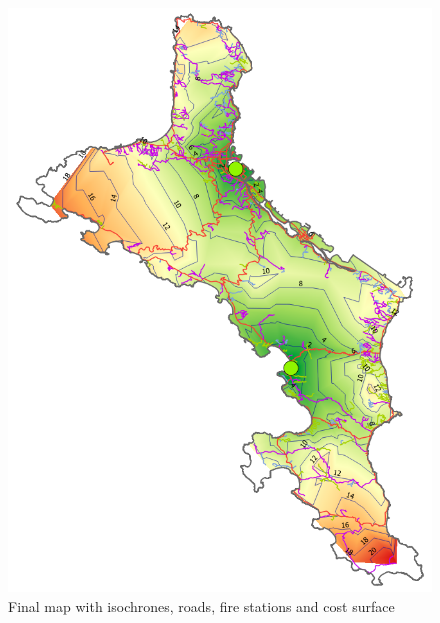 \documentclass[a4paper,12pt,titlepage]{article}
\begin{document}
\begin{figure}[htb]
	\centering
	\includegraphics[width=14cm]{Images/final_map.png}
	\caption{Final map with isochrones, roads, fire stations and cost surface}\label{fig:final_map}
\end{figure}
\end{document}
